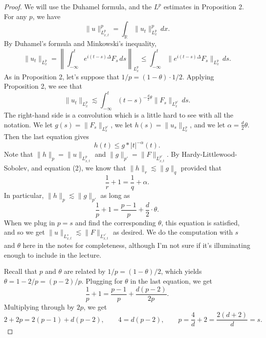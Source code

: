 \documentclass[UTF8,11pt]{ctexart}
\theoremstyle{definition}
\newcommand{\R}{\mathbb R}
\begin{document}
\begin{proof}
We will use the Duhamel formula, and the $L^p$ estimates in Proposition 2. For any $p$, we have
\[\|u\|_{L^p_{x,t}}^p=\int_\R\|u_t\|_{L^p_x}^p\,dx.\]
By Duhamel's formula and Minkowski's inequality,
\[\|u_t\|_{L^p_x}=\left\|\int_{-\infty}^te^{i(t-s)\Delta}F_s\,ds\right\|_{L^p_x}\leq\int_{-\infty}^t\|e^{i(t-s)\Delta}F_s\|_{L^p_x}\,ds.\]
As in Proposition 2, let's suppose that $1/p=(1-\theta)\cdot1/2$. Applying Proposition 2, we see that
\[\|u_t\|_{L^p_x}\lesssim\int_{-\infty}^t(t-s)^{-\frac d2\theta}\|F_s\|_{L^{p'}_x}\,ds.\tag{1}\]
The right-hand side is a convolution which is a little hard to see with all the notation. We let $g(s)=\|F_s\|_{L^{p'}_x}$, we let $h(s)=\|u_s\|_{L^p_x}$, and we let $\alpha=\frac d2\theta$. Then the last equation gives
\[h(t)\leq g*|t|^{-\alpha}(t).\tag{2}\]
Note that $\|h\|_p=\|u\|_{L^p_{x,t}}$ and $\|g\|_{p'}=\|F\|_{L^{p'}_{x,t}}$. By Hardy-Littlewood-Sobolev, and equation (2), we know that $\|h\|_r\lesssim\|g\|_q$ provided that
\[\frac1r+1=\frac1q+\alpha.\]
In particular, $\|h\|_p\lesssim\|g\|_{p'}$ as long as
\[\frac1p+1=\frac{p-1}{p}+\frac d2\cdot\theta.\]
When we plug in $p=s$ and find the corresponding $\theta$, this equation is satisfied, and so we get $\|u\|_{L^s_{x,t}}\lesssim\|F\|_{L^{s'}_{x,t}}$ as desired. We do the computation with $s$ and $\theta$ here in the notes for completeness, although I'm not sure if it's illuminating enough to include in the lecture.

Recall that $p$ and $\theta$ are related by $1/p=(1-\theta)/2$, which yields $\theta=1-2/p=(p-2)/p$. Plugging for $\theta$ in the last equation, we get
\[\frac1p+1=\frac{p-1}{p}+\frac{d(p-2)}{2p}.\]
Multiplying through by $2p$, we get
\[2+2p=2(p-1)+d(p-2),\qquad4=d(p-2),\qquad p=\frac4d+2=\frac{2(d+2)}d=s.\]
\end{proof}
\end{document}
